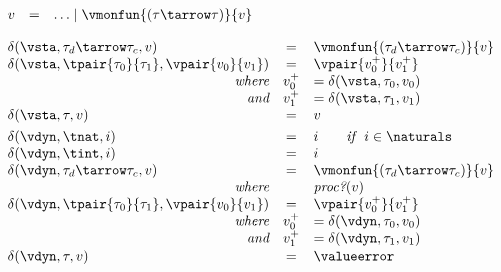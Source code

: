 {\flushleft

$\begin{array}{l c l}
  v & = & \ldots \mid \vmonfun{(\tau\tarrow\tau)}{v}
\end{array}$

\medskip
{}
\begin{mathpar}
\end{mathpar}

\medskip
{}
$\begin{array}{l c l}
  \delta(\vsta, \tau_d \tarrow \tau_c, v) & = & \vmonfun{(\tau_d \tarrow \tau_c)}{v}
\\
  \delta(\vsta, \tpair{\tau_0}{\tau_1}, \vpair{v_0}{v_1}) & = & \vpair{v_0^+}{v_1^+}
\\
  \hfill\emph{where} & v_0^+ & = \delta(\vsta, \tau_0, v_0)
\\
  \hfill\emph{and} & v_1^+ & = \delta(\vsta, \tau_1, v_1)
\\
  \delta(\vsta, \tau, v) & = & v
\\[0.8ex]
  \delta(\vdyn, \tnat, i) & = & i \qquad \emph{if}~~i \in \naturals
\\
  \delta(\vdyn, \tint, i) & = & i
\\
  \delta(\vdyn, \tau_d \tarrow \tau_c, v) & = & \vmonfun{(\tau_d \tarrow \tau_c)}{v}
\\ \hfill\emph{where} & & \emph{proc?}(v)
\\
  \delta(\vdyn, \tpair{\tau_0}{\tau_1}, \vpair{v_0}{v_1}) & = & \vpair{v_0^+}{v_1^+}
\\ \hfill\emph{where} & v_0^+ & = \delta(\vdyn, \tau_0, v_0)
\\ \hfill\emph{and} & v_1^+ & = \delta(\vdyn, \tau_1, v_1)
\\[0.2ex]
  \delta(\vdyn, \tau, v) & = & \valueerror
\end{array}$

\medskip
\begin{minipage}{0.5\columnwidth}
\begin{mathpar}
\end{mathpar}
\end{minipage}%
\begin{minipage}{0.5\columnwidth}
\begin{mathpar}
\end{mathpar}
\end{minipage}
}
